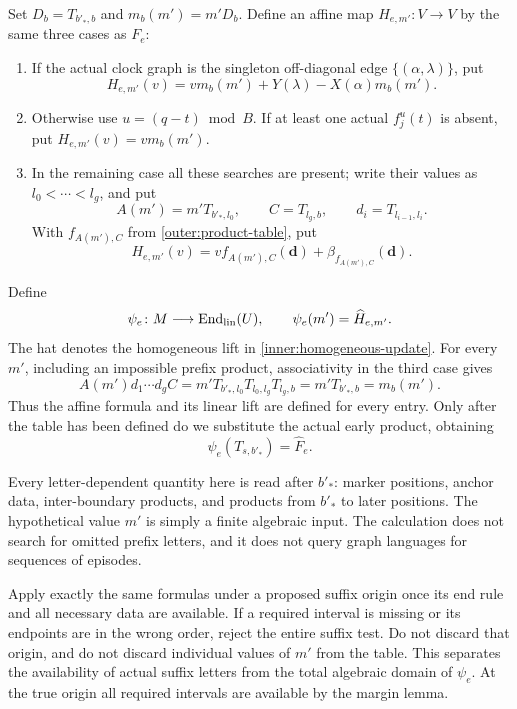 Set $D_b=T_{b'_*,b}$ and $m_b(m')=m'D_b$.  Define an affine map
$H_{e,m'}\colon V\to V$ by the same three cases as $F_e$:
\begin{enumerate}
\item If the actual clock graph is the singleton off-diagonal
      edge $\{(\alpha,\lambda)\}$, put
      \[
      H_{e,m'}(v)=v m_b(m')+Y(\lambda)-X(\alpha)m_b(m').
      \]
\item Otherwise use $u=(q-t)\bmod B$.  If at least one actual
      $f_j^u(t)$ is absent, put $H_{e,m'}(v)=v m_b(m')$.
\item In the remaining case all these searches are present; write their values as
      $l_0<\cdots<l_g$, and put
      \[
      A(m')=m'T_{b'_*,l_0},\qquad C=T_{l_g,b},\qquad
      d_i=T_{l_{i-1},l_i}.
      \]
      With $f_{A(m'),C}$ from \eqref{outer:product-table}, put
      \[
      H_{e,m'}(v)=
      v f_{A(m'),C}(\mathbf d)
      +\beta_{f_{A(m'),C}}(\mathbf d).
      \]
\end{enumerate}
Define
\begin{equation}
 \psi_e\colon M\longrightarrow\operatorname{End}_{\rm lin}(U),
 \qquad \psi_e(m')=\widehat H_{e,m'}.
 \label{inner:total-table}
\end{equation}
The hat denotes the homogeneous lift in
\eqref{inner:homogeneous-update}. For every $m'$, including an impossible
prefix product, associativity in the third case gives
\[
 A(m')d_1\cdots d_g C
   =m'T_{b'_*,l_0}T_{l_0,l_g}T_{l_g,b}
   =m'T_{b'_*,b}=m_b(m').
\]
Thus the affine formula and its linear lift are defined for every entry.
Only after the table has been defined do we substitute the actual early
product, obtaining
\begin{equation}
                    \psi_e(T_{s,b'_*})=\widehat F_e.
 \label{inner:actual-table-entry}
\end{equation}

Every letter-dependent quantity here is read after $b'_*$: marker
positions, anchor data, inter-boundary products, and products from
$b'_*$ to later positions. The hypothetical value $m'$ is simply a
finite algebraic input. The calculation does not search for omitted
prefix letters, and it does not query graph languages for sequences of
episodes.

Apply exactly the same formulas under a proposed suffix origin once its
end rule and all necessary data are available. If a required interval is
missing or its endpoints are in the wrong order, reject the entire suffix
test. Do not discard that origin, and do not discard individual values of
$m'$ from the table. This separates the availability of actual suffix
letters from the total algebraic domain of $\psi_e$. At the true origin
all required intervals are available by the margin lemma.

